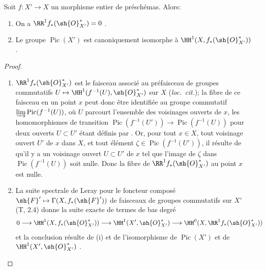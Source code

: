 \begin{corollary}[21.8.2]
\label{IV.21.8.2}
Soit $f:X'\to X$ un morphisme entier de préschémas.
Alors:
\begin{enumerate}[label=(\roman*)]
  \item On a $\RR^1 f_*(\sh{O}^*_{X'})=0$ .
  \item Le groupe $\operatorname{Pic}(X')$ est canoniquement isomorphe à $\HH^1(X,f_*(\sh{O}^*_{X'}))$.
\end{enumerate}
\end{corollary}

\begin{proof}
\begin{enumerate}[label=(\roman*)]
  \item $\RR^1 f_*(\sh{O}^*_{X'})$ est le faisceau associé au préfaisceau de groupes commutatifs $U\mapsto\HH^1(f^{-1}(U),\sh{O}^*_{X'})$ sur $X$ (\emph{loc.\ cit.});
la fibre de ce faisceau en un point $x$ peut donc  être identifiée au groupe commutatif $\varinjlim\operatorname{Pic}(f^{-1}(U))$, où $U$ parcourt l'ensemble des voisinages ouverts de $x$, les homomorphismes de transition $\operatorname{Pic}(f^{-1}(U'))\to\operatorname{Pic}(f^{-1}(U))$ pour deux ouverts $U\subset U'$ étant définis par .
Or, pour tout $x\in X$, tout voisinage ouvert $U'$ de $x$ dans $X$, et tout élément $\zeta\in\operatorname{Pic}(f^{-1}(U'))$, il résulte de  qu'il y a un voisinage ouvert $U\subset U'$ de $x$ tel que l'image de $\zeta$ dans $\operatorname{Pic}(f^{-1}(U))$ soit nulle.
Donc la fibre de $\RR^1f_*(\sh{O}^*_{X'})$ au point $x$ est nulle.

  \item La suite spectrale de Leray pour le foncteur composé $\sh{F}'\mapsto\Gamma(X,f_*(\sh{F}'))$ de faisceaux de groupes commutatifs sur $X'$ (T, 2.4) donne la suite exacte de termes de bas degré
\[
  0\to\HH^1(X,f_*(\sh{O}^*_{X'}))\to\HH^1(X',\sh{O}^*_{X'})\to\HH^0(X,\RR^1f_*(\sh{O}^*_{X'}))
\]
et la conclusion résulte de (i) et de l'isomorphisme de $\operatorname{Pic}(X')$ et de $\HH^1(X',\sh{O}^*_{X'})$ .
\end{enumerate}
\end{proof}

